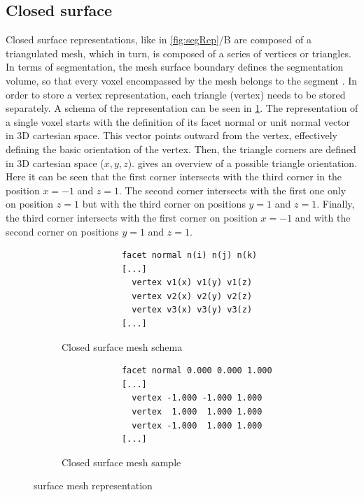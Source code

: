 \subsection{Closed surface}\label{s:b-closed-surface}
Closed surface representations, like in \cref{fig:segRep}/B are composed of a triangulated mesh,
which in turn, is composed of a series of vertices or triangles.
In terms of segmentation, the mesh surface boundary defines the segmentation volume,
so that every voxel encompassed by the mesh belongs to the segment \cite{delameMedialSurfaceMesh2012,weber3DSlicerPlatform2022,pinterPolymorphSegmentationRepresentation2019}.
In order to store a vertex representation, each triangle (vertex) needs to be stored separately.
A schema of the representation can be seen in \cref{fig:surfacemesh-schema}.
The representation of a single voxel starts with the definition of its facet normal or unit normal vector in 3D cartesian space.
This vector points outward from the vertex, effectively defining the basic orientation of the vertex.
Then, the triangle corners are defined in 3D cartesian space ($x,y,z$).
 gives an overview of a possible triangle orientation.
Here it can be seen that the first corner intersects with the third corner in the position
$x=-1$ and $z=1$.
The second corner intersects with the first one only on position $z=1$ but with the third corner on positions
$y=1$ and $z=1$.
Finally, the third corner intersects with the first corner on position $x=-1$ and
with the second corner on positions $y=1$ and $z=1$.

\begin{figure}[h] %
	\begin{subfigure}{0.49\textwidth}
		\begin{verbatim}
			facet normal n(i) n(j) n(k)
			[...]
			  vertex v1(x) v1(y) v1(z)
			  vertex v2(x) v2(y) v2(z)
			  vertex v3(x) v3(y) v3(z)
			[...]
		\end{verbatim}
		\caption{Closed surface mesh schema}\label{fig:surfacemesh-schema}
	\end{subfigure}
	\begin{subfigure}{0.49\textwidth}
		\begin{verbatim}
			facet normal 0.000 0.000 1.000
			[...]
			  vertex -1.000 -1.000 1.000
			  vertex  1.000  1.000 1.000
			  vertex -1.000  1.000 1.000
			[...]
		\end{verbatim}
		\caption{Closed surface mesh sample}\label{fig:surfacemesh}
	\end{subfigure}
	\caption{surface mesh representation}\label{fig:mesh-repesentation}
\end{figure}

